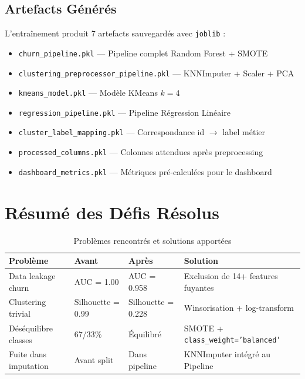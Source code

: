 \documentclass[12pt,a4paper]{article}
\begin{document}
\subsection{Artefacts Générés}

L'entraînement produit 7 artefacts sauvegardés avec \texttt{joblib} :

\begin{itemize}
  \item \texttt{churn\_pipeline.pkl} — Pipeline complet Random Forest + SMOTE
  \item \texttt{clustering\_preprocessor\_pipeline.pkl} — KNNImputer + Scaler + PCA
  \item \texttt{kmeans\_model.pkl} — Modèle KMeans $k=4$
  \item \texttt{regression\_pipeline.pkl} — Pipeline Régression Linéaire
  \item \texttt{cluster\_label\_mapping.pkl} — Correspondance id $\to$ label métier
  \item \texttt{processed\_columns.pkl} — Colonnes attendues après preprocessing
  \item \texttt{dashboard\_metrics.pkl} — Métriques pré-calculées pour le dashboard
\end{itemize}

\section{Résumé des Défis Résolus}

\begin{table}[H]
\centering
\caption{Problèmes rencontrés et solutions apportées}
\begin{tabular}{p{3.5cm}p{2.5cm}p{2.5cm}p{4cm}}
\toprule
\textbf{Problème} & \textbf{Avant} & \textbf{Après} & \textbf{Solution} \\
\midrule
Data leakage churn & AUC = 1.00 & AUC = 0.958 & Exclusion de 14+ features fuyantes \\
\addlinespace
Clustering trivial & Silhouette = 0.99 & Silhouette = 0.228 & Winsorisation + log-transform \\
\addlinespace
Déséquilibre classes & 67/33\% & Équilibré & SMOTE + \texttt{class\_weight='balanced'} \\
\addlinespace
Fuite dans imputation & Avant split & Dans pipeline & KNNImputer intégré au Pipeline \\
\bottomrule
\end{tabular}
\end{table}
\end{document}
